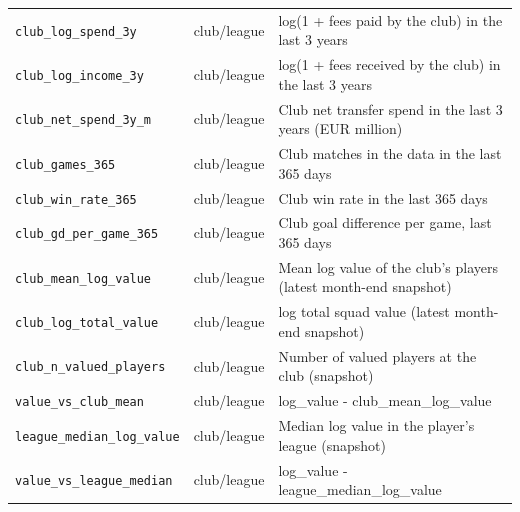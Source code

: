 \begin{table}[!h]
\begin{tabular}{llp{11.5cm}}
\texttt{club\_log\_spend\_3y} & club/league & log(1 + fees paid by the club) in the last 3 years \\
\texttt{club\_log\_income\_3y} & club/league & log(1 + fees received by the club) in the last 3 years \\
\texttt{club\_net\_spend\_3y\_m} & club/league & Club net transfer spend in the last 3 years (EUR million) \\
\texttt{club\_games\_365} & club/league & Club matches in the data in the last 365 days \\
\texttt{club\_win\_rate\_365} & club/league & Club win rate in the last 365 days \\
\texttt{club\_gd\_per\_game\_365} & club/league & Club goal difference per game, last 365 days \\
\texttt{club\_mean\_log\_value} & club/league & Mean log value of the club's players (latest month-end snapshot) \\
\texttt{club\_log\_total\_value} & club/league & log total squad value (latest month-end snapshot) \\
\texttt{club\_n\_valued\_players} & club/league & Number of valued players at the club (snapshot) \\
\texttt{value\_vs\_club\_mean} & club/league & log\_value - club\_mean\_log\_value \\
\texttt{league\_median\_log\_value} & club/league & Median log value in the player's league (snapshot) \\
\texttt{value\_vs\_league\_median} & club/league & log\_value - league\_median\_log\_value \\
\bottomrule
\end{tabular}
\end{table}

